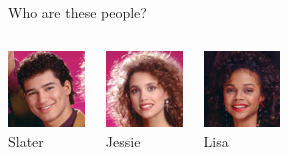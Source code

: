 \documentclass{beamer}\usepackage[]{graphicx}\usepackage[]{color}
\begin{document}
\begin{darkframes}
\begin{frame}{Who are these people?}
\begin{columns}[onlytextwidth]
          \begin{center}
            \includegraphics[width=0.8in]{slater} \\
            Slater
          \end{center}
          \begin{center}
            \includegraphics[width=0.8in]{jessie} \\
            Jessie
          \end{center}
          \begin{center}
            \includegraphics[width=0.8in]{lisa} \\
            Lisa
          \end{center}
      \end{columns}
    \end{frame}


\end{darkframes}
\end{document}

